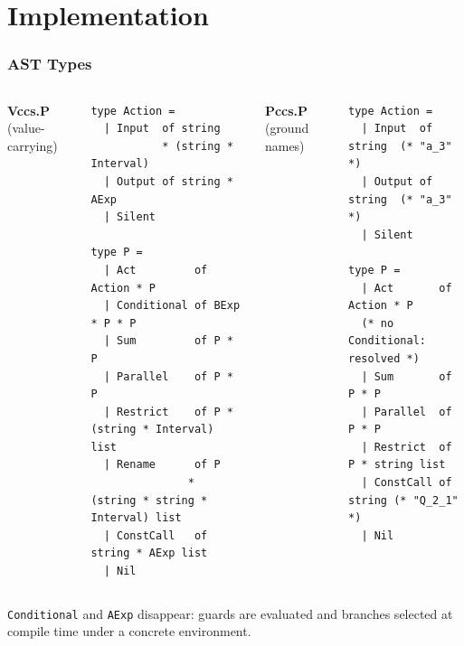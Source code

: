 \documentclass[t]{beamer}
\begin{document}
\section{Implementation}

  \begin{frame}[fragile]
    \frametitle{AST Types}

    \begin{columns}[t]
      \textbf{Vccs.P} \quad (value-carrying)
      \begin{lstlisting}[basicstyle=\ttfamily\scriptsize]
type Action =
  | Input  of string
           * (string * Interval)
  | Output of string * AExp
  | Silent

type P =
  | Act         of Action * P
  | Conditional of BExp * P * P
  | Sum         of P * P
  | Parallel    of P * P
  | Restrict    of P * (string * Interval) list
  | Rename      of P
               * (string * string * Interval) list
  | ConstCall   of string * AExp list
  | Nil
      \end{lstlisting}

      \textbf{Pccs.P} \quad (ground names)
      \begin{lstlisting}[basicstyle=\ttfamily\scriptsize]
type Action =
  | Input  of string  (* "a_3"   *)
  | Output of string  (* "a_3"   *)
  | Silent

type P =
  | Act       of Action * P
  (* no Conditional: resolved *)
  | Sum       of P * P
  | Parallel  of P * P
  | Restrict  of P * string list
  | ConstCall of string (* "Q_2_1" *)
  | Nil
      \end{lstlisting}
    \end{columns}

    \vspace{0.2cm}
    \small
    \texttt{Conditional} and \texttt{AExp} disappear: guards are evaluated
    and branches selected at compile time under a concrete environment.

  \end{frame}
\end{document}
